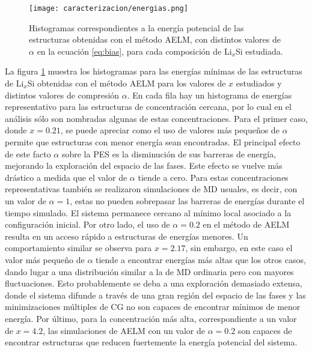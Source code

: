 \begin{figure}[th]
    \centering
    \texttt{[image: caracterizacion/energias.png]}
    \caption{Histogramas correspondientes a la energía potencial de las 
    estructuras obtenidas con el método AELM, con distintos valores de $\alpha$
    en la ecuación \ref{eq:bias}, para cada composición de Li$_x$Si estudiada.}
    \label{fig:energias}
\end{figure}
La figura \ref{fig:energias} muestra los histogramas para las energías mínimas
de las estructuras de Li$_x$Si obtenidas con el método AELM para los valores de
$x$ estudiados y distintos valores de compresión $\alpha$. En cada fila hay un 
histograma de energías representativo para las estructuras de concentración 
cercana, por lo cual en el análisis sólo son nombradas algunas de estas 
concentraciones. Para el primer caso, donde $x = 0.21$, se puede apreciar como el 
uso de valores más pequeños de $\alpha$ permite que estructuras con menor energía 
sean encontradas. El principal efecto de este facto $\alpha$ sobre la PES es la 
disminución de sus barreras de energía, mejorando la exploración del espacio de 
las fases. Este efecto se vuelve más drástico a medida que el valor de $\alpha$ 
tiende a cero. Para estas concentraciones representativas también se realizaron 
simulaciones de MD usuales, es decir, con un valor de $\alpha = 1$, estas no 
pueden sobrepasar las barreras de energías durante el tiempo simulado. El sistema 
permanece cercano al mínimo local asociado a la configuración inicial. Por otro 
lado, el uso de $\alpha = 0.2$ en el método de AELM resulta en un acceso rápido
a estructuras de energías menores. Un comportamiento similar se observa para 
$x = 2.17$, sin embargo, en este caso el valor más pequeño de $\alpha$ tiende a 
encontrar energías más altas que los otros casos, dando lugar a una distribución
similar a la de MD ordinaria pero con mayores fluctuaciones. Esto probablemente 
se deba a una exploración demasiado extensa, donde el sistema difunde a través
de una gran región del espacio de las fases y las minimizaciones múltiples de 
CG no son capaces de encontrar mínimos de menor energía. Por último, para la 
concentración más alta, correspondiente a un valor de $x = 4.2$, las simulaciones 
de AELM con un valor de $\alpha = 0.2$ son capaces de encontrar estructuras que 
reducen fuertemente la energía potencial del sistema. 

